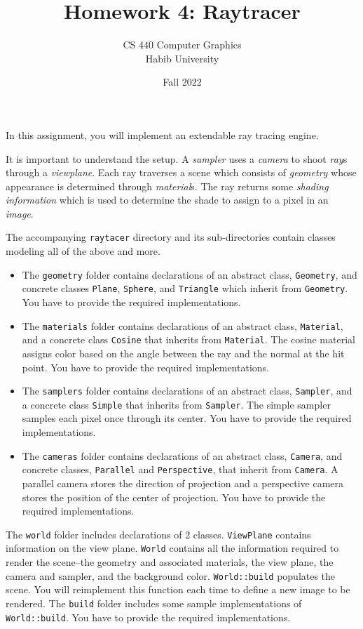 \documentclass[addpoints]{exam}
\title{Homework 4: Raytracer}
\author{CS 440 Computer Graphics\\Habib University}
\date{Fall 2022}
\begin{document}
\maketitle


In this assignment, you will implement an extendable ray tracing engine.

It is important to understand the setup. A \textit{sampler} uses a \textit{camera} to shoot \textit{ray}s through a \textit{viewplane}. Each ray traverses a scene which consists of \textit{geometry} whose appearance is determined through \emph{material}s. The ray returns some \textit{shading information} which is used to determine the shade to assign to a pixel in an \textit{image}.

The accompanying \texttt{raytacer} directory and its sub-directories contain classes modeling all of the above and more.
\begin{itemize}
\item The \texttt{geometry} folder contains declarations of an abstract class, \texttt{Geometry}, and concrete classes  \texttt{Plane}, \texttt{Sphere}, and \texttt{Triangle} which inherit from \texttt{Geometry}. You have to provide the required implementations.
\item The \texttt{materials} folder contains declarations of an abstract class, \texttt{Material}, and a concrete class  \texttt{Cosine} that inherits from \texttt{Material}. The cosine material assigns color based on the angle between the ray and the normal at the hit point. You have to provide the required implementations.
\item The \texttt{samplers} folder contains declarations of an abstract class, \texttt{Sampler}, and a concrete class  \texttt{Simple} that inherits from \texttt{Sampler}. The simple sampler samples each pixel once through its center. You have to provide the required implementations.
\item The \texttt{cameras} folder contains declarations of an abstract class, \texttt{Camera}, and concrete classes, \texttt{Parallel} and \texttt{Perspective}, that inherit from \texttt{Camera}. A parallel camera stores the direction of projection and a perspective camera stores the position of the center of projection. You have to provide the required implementations.
\end{itemize}

The \texttt{world} folder includes declarations of 2 classes. \texttt{ViewPlane} contains information on the view plane. \texttt{World} contains all the information required to render the scene--the geometry and associated materials, the view plane, the camera and sampler, and the background color. \texttt{World::build} populates the scene. You will reimplement this function each time to define a new image to be rendered. The \texttt{build} folder includes some sample implementations of \texttt{World::build}. You have to provide the required implementations.
\end{document}
